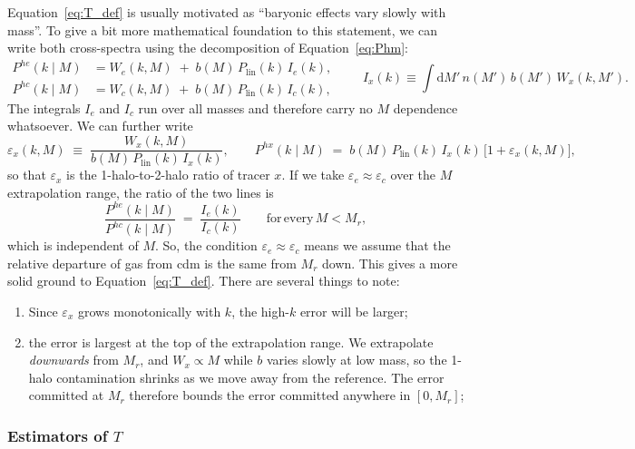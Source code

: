 \documentclass{article}
\newcommand{\dd}{\mathrm{d}}
\begin{document}
Equation~\eqref{eq:T_def} is usually motivated as ``baryonic effects vary slowly with mass''. To give a bit more mathematical foundation to this statement, we can write both cross-spectra using the decomposition of Equation~\eqref{eq:Phm}:
\begin{equation} \label{eq:two_tracers}
\begin{aligned}
    P^{he}(k \mid M) &= W_e(k, M) \;+\; b(M)\, P_\mathrm{lin}(k)\, I_e(k), \\
    P^{hc}(k \mid M) &= W_c(k, M) \;+\; b(M)\, P_\mathrm{lin}(k)\, I_c(k),
\end{aligned}
\qquad
I_x(k) \equiv \int \dd M' \, n(M')\, b(M')\, W_x(k, M').
\end{equation}
The integrals $I_e$ and $I_c$ run over all masses and therefore carry no $M$ dependence whatsoever. We can further write
\begin{equation} \label{eq:eps_def}
    \varepsilon_x(k, M) \;\equiv\; \frac{W_x(k,M)}{b(M)\, P_\mathrm{lin}(k)\, I_x(k)},
    \qquad
    P^{hx}(k \mid M) \;=\; b(M)\, P_\mathrm{lin}(k)\, I_x(k) \, \big[1 + \varepsilon_x(k,M)\big],
\end{equation}
so that $\varepsilon_x$ is the 1-halo-to-2-halo ratio of tracer $x$. If we take $\varepsilon_e \approx \varepsilon_c$ over the $M$ extrapolation range, the ratio of the two lines is
\begin{equation} \label{eq:factorisation}
    \frac{P^{he}(k \mid M)}{P^{hc}(k \mid M)} \;=\; \frac{I_e(k)}{I_c(k)} \qquad \mathrm{for \, every} \, M < M_r,
\end{equation}
which is independent of $M$. So, the condition $\varepsilon_e \approx \varepsilon_c$ means we assume that the relative departure of gas from cdm is the same from $M_r$ down. This gives a more solid ground to Equation~\eqref{eq:T_def}. There are several things to note:
\begin{enumerate}
    \item[(a)] Since $\varepsilon_x$ grows monotonically with $k$, the high-$k$ error will be larger;
    \item[(b)] the error is largest at the top of the extrapolation range. We extrapolate \emph{downwards} from $M_r$, and $W_x \propto M$ while $b$ varies slowly at low mass, so the 1-halo contamination shrinks as we move away from the reference. The error committed at $M_r$ therefore bounds the error committed anywhere in $[0, M_r]$;
\end{enumerate}

\subsubsection{Estimators of $T$}
\end{document}
